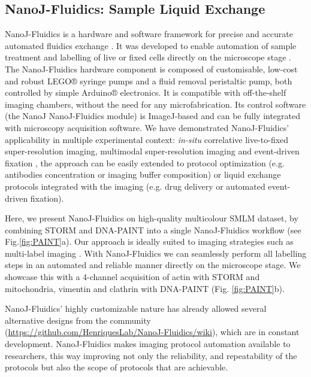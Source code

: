 \subsection*{NanoJ-Fluidics: Sample Liquid Exchange}

 NanoJ-Fluidics is a hardware and software framework for precise and accurate automated fluidics exchange \cite{almada2018automating}. It was developed to enable automation of sample treatment and labelling of live or fixed cells directly on the microscope stage \cite{dix2018role}. The NanoJ-Fluidics hardware component is composed of customisable, low-cost and robust LEGO® syringe pumps and a fluid removal peristaltic pump, both controlled by simple Arduino® electronics. It is compatible with off-the-shelf imaging chambers, without the need for any microfabrication. Its control software (the NanoJ NanoJ-Fluidics module) is ImageJ-based and can be fully integrated with microscopy acquisition software. We have demonstrated NanoJ-Fluidics' applicability in multiple experimental context: \textit{in-situ} correlative live-to-fixed super-resolution imaging, multimodal super-resolution imaging and event-driven fixation \cite{almada2018automating}, the approach can be easily  extended to protocol optimization (e.g. antibodies concentration or imaging buffer composition) or liquid exchange protocols integrated with the imaging (e.g. drug delivery or automated event-driven fixation).

 Here, we present NanoJ-Fluidics on high-quality multicolour SMLM dataset, by combining STORM and DNA-PAINT \cite{jungmann2014multiplexed} into a single NanoJ-Fluidics workflow (see Fig.\ref{fig:PAINT}a). Our approach is ideally suited to imaging strategies such as multi-label imaging \cite{dempsey2011evaluation}. With NanoJ-Fluidics we can seamlessly perform all labelling steps in an automated and reliable manner directly on the microscope stage. We showcase this with a 4-channel acquisition of actin with STORM and mitochondria, vimentin and clathrin with DNA-PAINT (Fig. \ref{fig:PAINT}b). 

 NanoJ-Fluidics' highly customizable nature has already allowed several alternative designs from the community (\href{https://github.com/HenriquesLab/NanoJ-Fluidics/wiki}{https://github.com/HenriquesLab/NanoJ-Fluidics/wiki}), which are in constant development. NanoJ-Fluidics makes imaging protocol automation available to researchers, this way improving not only the reliability, and repeatability of the protocols but also the scope of protocols that are achievable.  

